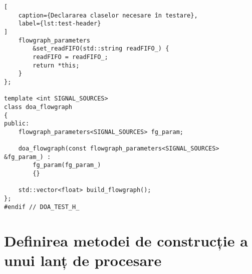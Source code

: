 \begin{lstlisting}[
    caption={Declararea claselor necesare în testare},
    label={lst:test-header}
]
    flowgraph_parameters
        &set_readFIFO(std::string readFIFO_) {
        readFIFO = readFIFO_;
        return *this;
    }
};

template <int SIGNAL_SOURCES>
class doa_flowgraph
{
public:
    flowgraph_parameters<SIGNAL_SOURCES> fg_param;

    doa_flowgraph(const flowgraph_parameters<SIGNAL_SOURCES> &fg_param_) :
        fg_param(fg_param_)
        {}

    std::vector<float> build_flowgraph();
};
#endif // DOA_TEST_H_
\end{lstlisting}

\section{Definirea metodei de construcție a unui lanț de procesare}
\label{sec:test-code}

